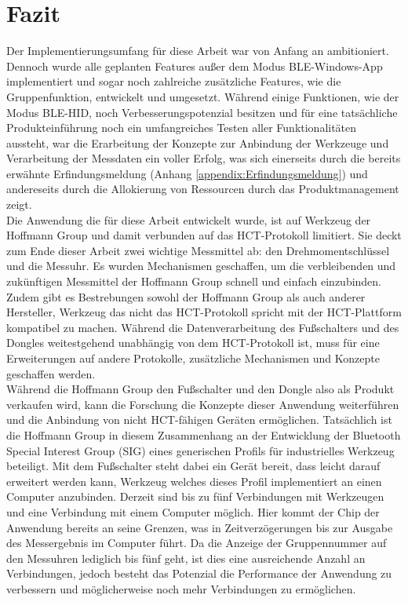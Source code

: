 \section{Fazit}
Der Implementierungsumfang für diese Arbeit war von Anfang an ambitioniert. Dennoch wurde alle geplanten Features außer dem Modus \ac{BLE}-Windows-App implementiert und sogar noch zahlreiche zusätzliche Features, wie die Gruppenfunktion, entwickelt und umgesetzt. Während einige Funktionen, wie der Modus \ac{BLE}-\ac{HID}, noch Verbesserungspotenzial besitzen und für eine tatsächliche Produkteinführung noch ein umfangreiches Testen aller Funktionalitäten aussteht, war die Erarbeitung der Konzepte zur Anbindung der Werkzeuge und Verarbeitung der Messdaten ein voller Erfolg, was sich einerseits durch die bereits erwähnte Erfindungsmeldung (Anhang \ref{appendix:Erfindungsmeldung}) und andereseits durch die Allokierung von Ressourcen durch das Produktmanagement zeigt.\\
Die Anwendung die für diese Arbeit entwickelt wurde, ist auf Werkzeug der Hoffmann Group und damit verbunden auf das \ac{HCT}-Protokoll limitiert. Sie deckt zum Ende dieser Arbeit zwei wichtige Messmittel ab: den Drehmomentschlüssel und die Messuhr. Es wurden Mechanismen geschaffen, um die verbleibenden und zukünftigen Messmittel der Hoffmann Group schnell und einfach einzubinden. Zudem gibt es Bestrebungen sowohl der Hoffmann Group als auch anderer Hersteller, Werkzeug das nicht das \ac{HCT}-Protokoll spricht mit der \ac{HCT}-Plattform kompatibel zu machen. Während die Datenverarbeitung des Fußschalters und des Dongles weitestgehend unabhängig von dem \ac{HCT}-Protokoll ist, muss für eine Erweiterungen auf andere Protokolle, zusätzliche Mechanismen und Konzepte geschaffen werden.\\
Während die Hoffmann Group den Fußschalter und den Dongle also als Produkt verkaufen wird, kann die Forschung die Konzepte dieser Anwendung weiterführen und die Anbindung von nicht \ac{HCT}-fähigen Geräten ermöglichen. Tatsächlich ist die Hoffmann Group in diesem Zusammenhang an der Entwicklung der Bluetooth Special Interest Group (SIG) eines generischen Profils für industrielles Werkzeug beteiligt. Mit dem Fußschalter steht dabei ein Gerät bereit, dass leicht darauf erweitert werden kann, Werkzeug welches dieses Profil implementiert an einen Computer anzubinden.
Derzeit sind bis zu fünf Verbindungen mit Werkzeugen und eine Verbindung mit einem Computer möglich. Hier kommt der Chip der Anwendung bereits an seine Grenzen, was in Zeitverzögerungen bis zur Ausgabe des Messergebnis im Computer führt. Da die Anzeige der Gruppennummer auf den Messuhren lediglich bis fünf geht, ist dies eine ausreichende Anzahl an Verbindungen, jedoch besteht das Potenzial die Performance der Anwendung zu verbessern und möglicherweise noch mehr Verbindungen zu ermöglichen.\\
